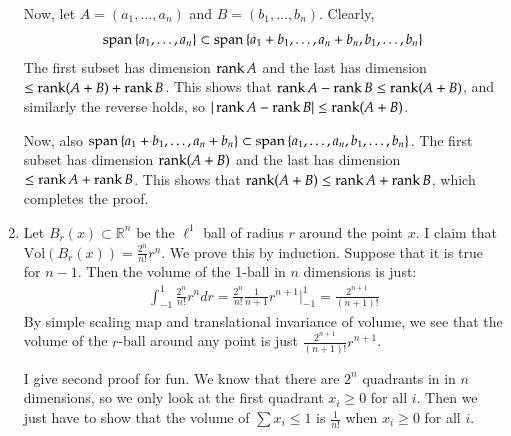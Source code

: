 \documentclass[12pt]{article}
\def\mbb#1{\mathbb{#1}}
\def\R{\mbb{R}}
\newcommand{\SET}[1]{\Set{\mskip-\medmuskip #1 \mskip-\medmuskip}}
\newcommand{\1}{\mathds 1}
\newcommand{\Vol}{\mathrm{Vol}}
\begin{document}
\begin{enumerate}
        Now, let $A = (a_1, \ldots, a_n)$ and $B = (b_1, \ldots, b_n)$. Clearly,
        \begin{align*}
            \mathrm{span} \SET{a_1, \ldots, a_n} \subset \mathrm{span} \SET{a_1+b_1, \ldots, a_n+b_n, b_1, \ldots, b_n}
        \end{align*} The first subset has dimension $\rank A$ and the last has dimension $\leq \rank (A+B) + \rank B$. This shows that $\rank A - \rank B \leq \rank (A+B)$, and similarly the reverse holds, so $|\rank A - \rank B| \leq \rank (A+B)$.

        Now, also $\mathrm{span} \SET{a_1+b_1, \ldots, a_n+b_n} \subset \mathrm{span} \SET{a_1, \ldots, a_n, b_1, \ldots, b_n}$. The first subset has dimension $\rank (A+B)$ and the last has dimension $\leq \rank A + \rank B$. This shows that $\rank (A+B) \leq \rank A + \rank B$, which completes the proof.

        \item Let $B_r(x) \subset \R^n$ be the $\ell^1$ ball of radius $r$ around the point $x$. I claim that $\Vol(B_r(x)) = \frac{2^n}{n!} r^n$. We prove this by induction. Suppose that it is true for $n-1$. Then the volume of the 1-ball in $n$ dimensions is just:
        \begin{align*}
            \int_{-1}^1 \frac{2^n}{n!} r^n dr = \frac{2^n}{n!} \frac{1}{n+1} r^{n+1} \Big|_{-1}^1 = \frac{2^{n+1}}{(n+1)!}
        \end{align*}
        By simple scaling map and translational invariance of volume, we see that the volume of the $r$-ball around any point is just $\frac{2^{n+1}}{(n+1)!} r^{n+1}$.

        I give second proof for fun. We know that there are $2^n$ quadrants in in $n$ dimensions, so we only look at the first quadrant $x_i \geq 0$ for all $i$. Then we just have to show that the volume of $\sum x_i \leq 1$ is $\frac{1}{n!}$ when $x_i \geq 0$ for all $i$. 


\end{enumerate}
\end{document}
